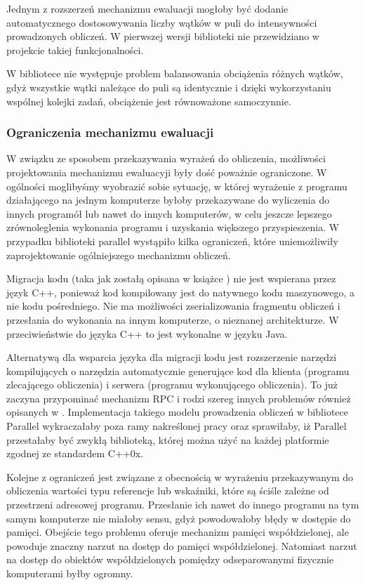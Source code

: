   Jednym z rozszerzeń mechanizmu ewaluacji mogłoby być dodanie automatycznego dostosowywania liczby wątków w puli do intensywności prowadzonych obliczeń.
  W pierwszej wersji biblioteki nie przewidziano w projekcie takiej funkcjonalności.
  
  W bibliotece nie występuje problem balansowania obciążenia różnych wątków, gdyż wszystkie wątki należące do puli są identycznie i dzięki wykorzystaniu wspólnej kolejki zadań, obciążenie jest równoważone samoczynnie.
  
\subsubsection{Ograniczenia mechanizmu ewaluacji}

  W związku ze sposobem przekazywania wyrażeń do obliczenia, możliwości projektowania mechanizmu ewaluacyji były dość poważnie ograniczone.
  W ogólności moglibyśmy wyobrazić sobie sytuację, w której wyrażenie z programu działającego na jednym komputerze byłoby przekazywane do wyliczenia do innych programół lub nawet do innych komputerów, w celu jeszcze lepszego zrównoleglenia wykonania programu i uzyskania większego przyspieszenia.
  W przypadku biblioteki parallel wystąpiło kilka ograniczeń, które uniemożliwiły zaprojektowanie ogólniejszego mechanizmu obliczeń.
  
  Migracja kodu (taka jak zostałą opisana w książce \cite{dissys}) nie jest wspierana przez język C++, ponieważ kod kompilowany jest do natywnego kodu maszynowego, a nie kodu pośredniego.
  Nie ma możliwości zserializowania fragmentu obliczeń i przesłania do wykonania na innym komputerze, o nieznanej architekturze.
  W przeciwieństwie do języka C++ to jest wykonalne w języku Java.
  
  Alternatywą dla wsparcia języka dla migracji kodu jest rozszerzenie narzędzi kompilujących o narzędzia automatycznie generujące kod dla klienta (programu zlecającego obliczenia) i serwera (programu wykonującego obliczenia).
  To już zaczyna przypominać mechanizm RPC i rodzi szereg innych problemów również opisanych w \cite{dissys}.
  Implementacja takiego modelu prowadzenia obliczeń w bibliotece Parallel wykraczałaby poza ramy nakreślonej pracy oraz sprawiłaby, iż Parallel przestałaby być zwykłą biblioteką, 
  której można użyć na każdej platformie zgodnej ze standardem C++0x.
  
  Kolejne z ograniczeń jest związane z obecnością w wyrażeniu przekazywanym do obliczenia wartości typu referencje lub wskaźniki, które są ściśle zależne od przestrzeni adresowej programu. 
  Przesłanie ich nawet do innego programu na tym samym komputerze nie miałoby sensu, gdyż powodowałoby błędy w dostępie do pamięci.
  Obejście tego problemu oferuje mechanizm pamięci współdzielonej, ale powoduje znaczny narzut na dostęp do pamięci współdzielonej.
  Natomiast narzut na dostęp do obiektów współdzielonych pomiędzy odseparowanymi fizycznie komputerami byłby ogromny.
  
